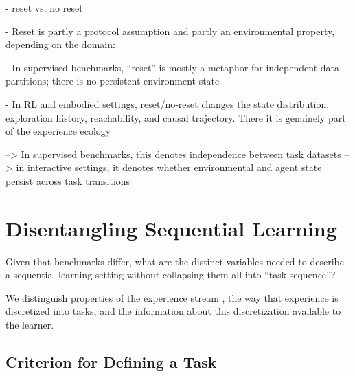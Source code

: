 \documentclass{article}
\begin{document}
            - reset vs. no reset
    
            - Reset is partly a protocol assumption and partly an environmental property, depending on the domain:
    
                - In supervised benchmarks, “reset” is mostly a metaphor for independent data partitions; there is no persistent environment state
                
                - In RL and embodied settings, reset/no-reset changes the state distribution, exploration history, reachability, and causal trajectory. There it is genuinely part of the experience ecology
    
            --> In supervised benchmarks, this denotes independence between task datasets
            --> in interactive settings, it denotes whether environmental and agent state persist across task transitions



                

    \section{Disentangling Sequential Learning}

        Given that benchmarks differ, what are the distinct variables needed to describe a sequential learning setting without collapsing them all into “task sequence”?

        We distinguish properties of the experience stream , the way that experience is discretized into tasks, and the information about this discretization available to the learner.
        

        
        

            \subsection{Criterion for Defining a Task}
    
\end{document}
